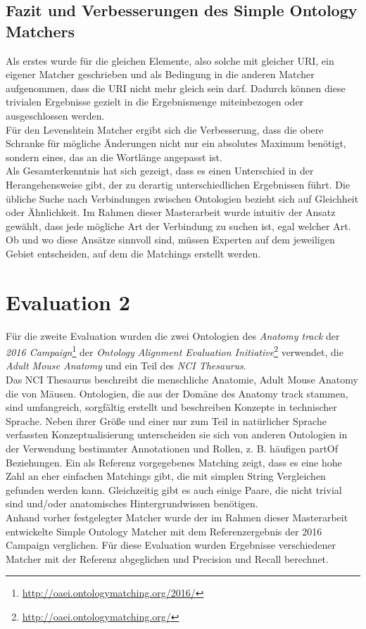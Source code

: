 		\subsection{Fazit und Verbesserungen des Simple Ontology Matchers}
		Als erstes wurde für die gleichen Elemente, also solche mit gleicher URI, ein
		eigener Matcher geschrieben und als Bedingung in die anderen Matcher
		aufgenommen, dass die URI nicht mehr gleich sein darf. Dadurch können diese
		trivialen Ergebnisse gezielt in die Ergebnismenge miteinbezogen oder
		ausgeschlossen werden.\\
		Für den Levenshtein Matcher ergibt sich die Verbesserung, dass die obere
		Schranke für mögliche Änderungen nicht nur ein absolutes Maximum benötigt,
		sondern eines, das an die Wortlänge angepasst ist.\\
		Als Gesamterkenntnis hat sich gezeigt, dass es einen Unterschied in der
		Herangehensweise gibt, der zu derartig unterschiedlichen Ergebnissen führt.
		Die übliche Suche nach Verbindungen zwischen Ontologien bezieht sich auf
		Gleichheit oder Ähnlichkeit. Im Rahmen dieser Masterarbeit wurde intuitiv der
		Ansatz gewählt, dass jede mögliche Art der Verbindung zu suchen ist, egal
		welcher Art. Ob und wo diese Ansätze sinnvoll sind, müssen Experten auf dem
		jeweiligen Gebiet entscheiden, auf dem die Matchings erstellt werden.
		
		\section{Evaluation 2}
		\label{subsec:Evaluation 2}
		Für die zweite Evaluation wurden die zwei Ontologien des \textit{Anatomy track} der
		\textit{2016 Campaign}\footnote{\url{http://oaei.ontologymatching.org/2016/}} der
		\textit{Ontology Alignment Evaluation
		Initiative}\footnote{\url{http://oaei.ontologymatching.org/}} verwendet,
		die \textit{Adult Mouse Anatomy} und ein Teil des \textit{NCI Thesaurus}.\\
		Das NCI Thesaurus beschreibt die menschliche Anatomie, Adult Mouse Anatomy die von
		Mäusen. Ontologien, die aus der Domäne des Anatomy track stammen, sind
		umfangreich, sorgfältig erstellt und beschreiben Konzepte in technischer
		Sprache. Neben ihrer Größe und einer nur zum Teil in natürlicher Sprache
		verfassten Konzeptualisierung unterscheiden sie sich von anderen Ontologien in
		der Verwendung bestimmter Annotationen und Rollen, z. B. häufigen partOf
		Beziehungen. Ein als Referenz vorgegebenes Matching zeigt, dass es eine hohe
		Zahl an eher einfachen Matchings gibt, die mit simplen String Vergleichen gefunden werden
		kann. Gleichzeitig gibt es auch einige Paare, die nicht trivial sind und/oder
		anatomisches Hintergrundwissen benötigen.\cite{OAEI16}\\
		Anhand vorher festgelegter Matcher wurde der im Rahmen dieser Masterarbeit
		entwickelte Simple Ontology Matcher mit dem Referenzergebnis der 2016 Campaign
		verglichen. Für diese Evaluation wurden Ergebnisse verschiedener Matcher mit
		der Referenz abgeglichen und Precision und Recall berechnet.\\
		
